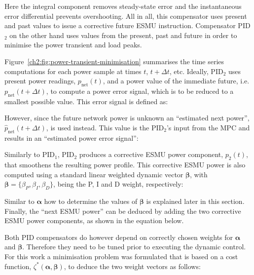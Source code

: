 

Here the integral component removes steady-state error and the instantaneous error differential prevents overshooting.
All in all, this compensator uses present and past values to issue a corrective future ESMU instruction.
Compensator PID$_2$ on the other hand uses values from the present, past and future in order to minimise the power transient and load peaks.



Figure~\ref{ch2:fig:power-transient-minimisation} summarises the time series computations for each power sample at times $t$, $t+\Delta t$, etc.
Ideally, PID$_2$ uses present power readings, $p_\text{net}(t)$, and a power value of the immediate future, i.e. $p_\text{net}(t+\Delta t)$, to compute a power error signal, which is to be reduced to a smallest possible value.
This error signal is defined as:



However, since the future network power is unknown an ``estimated next power'', $\hat{p}_\text{net}(t+\Delta t)$, is used instead.
This value is the PID$_2$'s input from the MPC and results in an ``estimated power error signal'':



Similarly to PID$_1$, PID$_2$ produces a corrective ESMU power component, $p_2(t)$, that smoothens the resulting power profile.
This corrective ESMU power is also computed using a standard linear weighted dynamic vector $\boldsymbol{\beta}$, with $\boldsymbol{\beta} = \{\beta_P, \beta_I, \beta_D\}$, being the P, I and D weight, respectively:



Similar to $\boldsymbol{\alpha}$ how to determine the values of $\boldsymbol{\beta}$ is explained later in this section.
Finally, the ``next ESMU power'' can be deduced by adding the two corrective ESMU power components, as shown in the equation below.



Both PID compensators do however depend on correctly chosen weights for $\boldsymbol{\alpha}$ and $\boldsymbol{\beta}$.
Therefore they need to be tuned prior to executing the dynamic control.
For this work a minimisation problem was formulated that is based on a cost function, $\zeta^*(\boldsymbol{\alpha}, \boldsymbol{\beta})$, to deduce the two weight vectors as follows:

